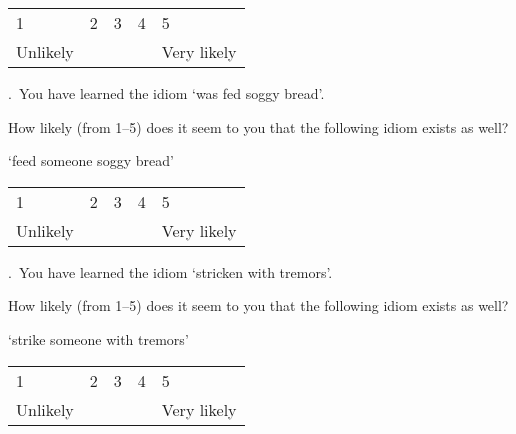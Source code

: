 \documentclass[output=paper]{langsci/langscibook}
\begin{document}
\noindent \begin{tabularx}{\textwidth}{XXXXX}
        1 & 2 & 3 & 4 & 5\\
        Unlikely & & & & Very likely\\
        \end{tabularx}\vspace{1\baselineskip}


.\ You have learned the idiom \enquote*{{was fed soggy bread}}.

\noindent How likely (from 1--5) does it seem to you that the following idiom exists
    as well?\vspace{.5\baselineskip}

\noindent \enquote*{{feed someone soggy bread}}\vspace{.5\baselineskip}

\noindent \begin{tabularx}{\textwidth}{XXXXX}
        1 & 2 & 3 & 4 & 5\\
        Unlikely & & & & Very likely\\
        \end{tabularx}\vspace{1\baselineskip}


.\ You have learned the idiom \enquote*{{stricken with tremors}}.

\noindent How likely (from 1--5) does it seem to you that the following idiom exists
    as well?\vspace{.5\baselineskip}

\noindent \enquote*{{strike someone with tremors}}\vspace{.5\baselineskip}

\noindent \begin{tabularx}{\textwidth}{XXXXX}
        1 & 2 & 3 & 4 & 5\\
        Unlikely & & & & Very likely\\
        \end{tabularx}

\end{document}
